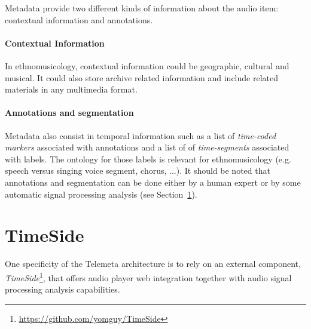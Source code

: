 \documentclass{aes53i}
\begin{document}
Metadata provide two different kinds of information about the audio item: contextual information and annotations.
\vspace{-0.4cm}

\paragraph{Contextual Information}
In ethnomusicology, contextual information could be geographic, cultural and musical. It could also store archive related information and include related materials in any multimedia format.
\vspace{-0.4cm}
\paragraph{Annotations and segmentation}
Metadata also consist in temporal information such as a list of \emph{time-coded markers} associated with annotations and a list of of \emph{time-segments} associated with labels. The ontology for those labels is relevant for ethnomusicology (e.g. speech versus singing voice segment, chorus, ...).
It should be noted that annotations and segmentation can be done either by a human expert or by some automatic signal processing analysis (see Section~\ref{sec:Timeside}).

\section{TimeSide}\label{sec:Timeside}
One specificity of the Telemeta architecture is to rely on an external component, \emph{TimeSide}\footnote{\url{https://github.com/yomguy/TimeSide}}, that offers audio player web integration together with audio signal processing analysis capabilities. 


\end{document}
